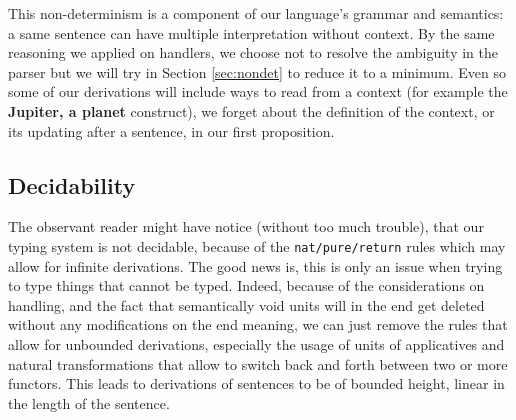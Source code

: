 This non-determinism is a component of our language's grammar and semantics: a same sentence can have multiple interpretation without context.
By the same reasoning we applied on handlers, we choose not to resolve the ambiguity in the parser but we will try in Section \ref{sec:nondet} to reduce it to a minimum.
Even so some of our derivations will include ways to read from a context (for example the \textbf{Jupiter, a planet} construct), we forget about the definition of the context, or its updating after a sentence, in our first proposition.

\subsection{Decidability}
The observant reader might have notice (without too much trouble), that our
typing system is not decidable, because of the \texttt{nat/pure/return} rules
which may allow for infinite derivations.
The good news is, this is only an issue when trying to type things that cannot
be typed.
Indeed, because of the considerations on handling, and the fact that
semantically void units will in the end get deleted without any modifications
on the end meaning, we can just remove the rules that allow for unbounded
derivations, especially the usage of units of applicatives and natural
transformations that allow to switch back and forth between two or more
functors.
This leads to derivations of sentences to be of bounded height, linear in the
length of the sentence.
